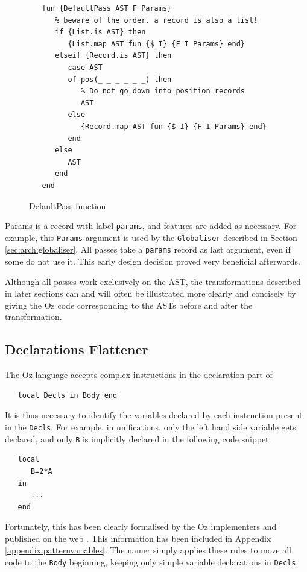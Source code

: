 \documentclass[a4paper]{memoir}
\begin{document}
\begin{figure}[h]
\begin{lstlisting}
   fun {DefaultPass AST F Params}
      % beware of the order. a record is also a list!
      if {List.is AST} then
         {List.map AST fun {$ I} {F I Params} end}
      elseif {Record.is AST} then
         case AST
         of pos(_ _ _ _ _ _) then
            % Do not go down into position records
            AST
         else
            {Record.map AST fun {$ I} {F I Params} end}
         end
      else
         AST
      end
   end
\end{lstlisting}
\caption{DefaultPass function}
\label{fig:default_pass}
\end{figure}



Params is a record with label \lstinline!params!, and features are added
as necessary. For example, this \lstinline!Params! argument is used by
the \lstinline!Globaliser! described in Section \ref{sec:arch:globaliser}. All
passes take a \lstinline!params! record as last argument, even if some do not use it. 
This early design decision proved very beneficial afterwards.


Although all passes work exclusively on the AST, the transformations described in later sections can and will often be illustrated more clearly and concisely by giving the Oz code corresponding to the ASTs before and after the transformation. 

\subsection{Declarations Flattener}\label{sec:arch:declsflattener}
The Oz language accepts complex instructions in the declaration part of
\begin{lstlisting}
   local Decls in Body end
\end{lstlisting}
 It is thus necessary to identify the variables declared by each instruction present in the \lstinline!Decls!. 
For example, in unifications, only the left hand side variable gets declared,
and only \lstinline!B! is implicitly declared in the following code snippet:
\begin{lstlisting}
   local
      B=2*A
   in
      ...
   end
\end{lstlisting}
Fortunately, this has been clearly formalised by the Oz implementers and published on the web \cite{BaseLang}. This information has been included in Appendix \ref{appendix:patternvariables}. The namer simply applies these rules to move all code to the \lstinline!Body! beginning, keeping only simple variable declarations in \lstinline!Decls!.
\end{document}

